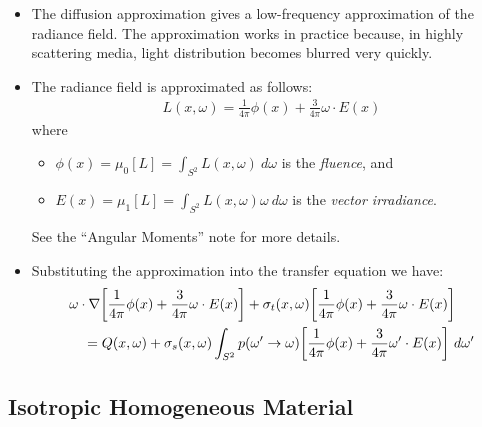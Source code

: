 \documentclass[10pt]{article}
\begin{document}
		\begin{itemize}
			\item The diffusion approximation gives a low-frequency approximation of the
				radiance field. The approximation works in practice because, in highly
				scattering media, light distribution becomes blurred very quickly.
				
			\item The radiance field is approximated as follows:
				\begin{align*}
					L(x,\omega) = \frac{1}{4\pi} \phi(x) + \frac{3}{4\pi} \omega \cdot E(x)
				\end{align*}
				where
				\begin{itemize}
					\item $\phi(x) = \mu_0[L] = \int_{S^2} L(x,\omega)\ d\omega $ is the \emph{fluence}, and
					\item $E(x) = \mu_1[L] = \int_{S^2} L(x,\omega) \omega\ d\omega $ is the \emph{vector irradiance}.
				\end{itemize}
				See the ``Angular Moments'' note for more details.
				
			\item Substituting the approximation into the transfer equation we have:
				\begin{align} \label{diffusion-transfer}
					&\omega \cdot \nabla \bigg[ \frac{1}{4\pi} \phi(x) + \frac{3}{4\pi} \omega \cdot E(x) \bigg] +
					\sigma_t(x,\omega) \bigg[ \frac{1}{4\pi} \phi(x) + \frac{3}{4\pi} \omega \cdot E(x) \bigg] \notag \\
					& \quad =  Q(x,\omega)
					+ \sigma_s(x,\omega) \int_{S^2} p(\omega' \rightarrow \omega) \bigg[ \frac{1}{4\pi} \phi(x) + \frac{3}{4\pi} \omega' \cdot E(x) \bigg]\ d \omega'
				\end{align}					
		\end{itemize}
		
	\subsection{Isotropic Homogeneous Material} %
	\label{sub:homogeneous_material}
	
\end{document}
